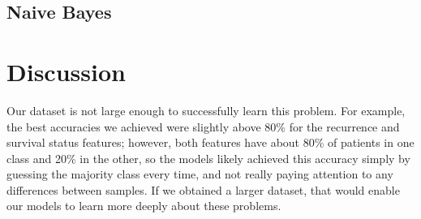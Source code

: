 \documentclass{article}
\begin{document}
\subsection{Naive Bayes}

\section{Discussion}

Our dataset is not large enough to successfully learn this problem. For example, the best accuracies we achieved were slightly above 80\% for the recurrence and survival status features; however, both features have about 80\% of patients in one class and 20\% in the other, so the models likely achieved this accuracy simply by guessing the majority class every time, and not really paying attention to any differences between samples. If we obtained a larger dataset, that would enable our models to learn more deeply about these problems.



\end{document}
